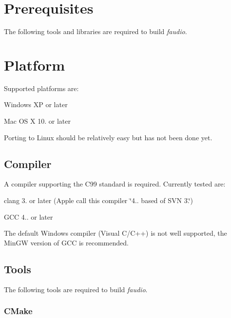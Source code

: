 \hypertarget{md__build_and_install_Prerequisites}{}\section{Prerequisites}\label{md__build_and_install_Prerequisites}
\label{md__build_and_install_Prerequisites}%
\hypertarget{md__build_and_install_Prerequisites}{}%


The following tools and libraries are required to build {\itshape faudio}.\hypertarget{md__build_and_install_Platform}{}\section{Platform}\label{md__build_and_install_Platform}
Supported platforms are\-:


\begin{DoxyItemize}
\item Windows X\-P or later
\item Mac O\-S X 10. or later
\end{DoxyItemize}

Porting to Linux should be relatively easy but has not been done yet.\hypertarget{md__build_and_install_Compiler}{}\subsection{Compiler}\label{md__build_and_install_Compiler}
A compiler supporting the C99 standard is required. Currently tested are\-:


\begin{DoxyItemize}
\item clang 3. or later (Apple call this compiler \char`\"{}4.. based of S\-V\-N 3.\char`\"{})
\item G\-C\-C 4.. or later
\end{DoxyItemize}

The default Windows compiler (Visual C/\-C++) is not well supported, the Min\-G\-W version of G\-C\-C is recommended.\hypertarget{md__build_and_install_Tools}{}\subsection{Tools}\label{md__build_and_install_Tools}
The following tools are required to build {\itshape faudio}.

\subsubsection*{C\-Make}

